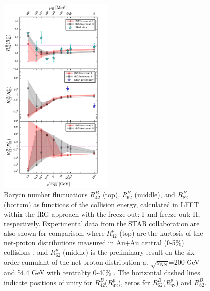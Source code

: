 \documentclass[%
reprint,
superscriptaddress,
showpacs,preprintnumbers,
 amsmath,amssymb,
 aps,
prd,
]{revtex4-1}
\begin{document}
%
\begin{figure}[t]
\includegraphics[width=0.5\textwidth]{Rm2-sqrtS}
\caption{Baryon number fluctuations $R^{B}_{42}$ (top), $R^{B}_{62}$ (middle), and $R^{B}_{82}$ (bottom) as functions of the collision energy, calculated in LEFT within the fRG approach with the freeze-out: I and freeze-out: II, respectively. Experimental data from the STAR collaboration are also shown for comparison, where $R^{p}_{42}$ (top) are the kurtosis of the net-proton distributions measured in Au+Au central (0-5\%) collisions \cite{Adam:2020unf}, and $R^{p}_{62}$ (middle) is the preliminary result on the six-order cumulant of the net-proton distribution at $\sqrt{s_{\mathrm{NN}}}$=200 GeV and 54.4 GeV with centrality 0-40\% \cite{Nonaka:2020crv,Pandav:2020uzx}. The horizontal dashed lines indicate positions of unity for $R^{B}_{42}$($R^{p}_{42}$), zeros for $R^{B}_{62}$($R^{p}_{62}$) and $R^{B}_{82}$.}\label{fig:Rm2-sqrtS}\vspace{-0.5cm}
\end{figure}
%
\end{document}
